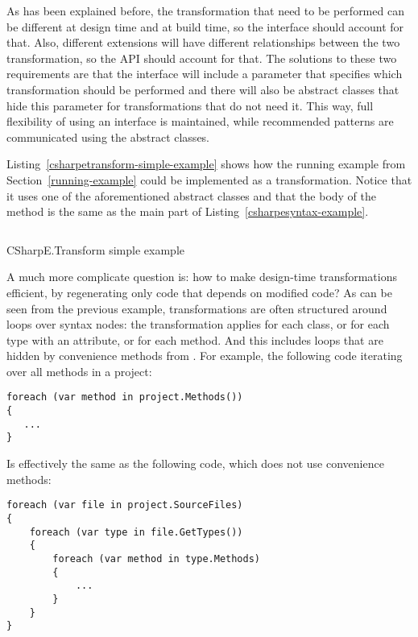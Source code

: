 As has been explained before, the transformation that need to be performed can be different at design time and at build time, so the interface should account for that. Also, different extensions will have different relationships between the two transformation, so the \ac{API} should account for that. The solutions to these two requirements are that the interface will include a parameter that specifies which transformation should be performed and there will also be abstract classes that hide this parameter for transformations that do not need it. This way, full flexibility of using an interface is maintained, while recommended patterns are communicated using the abstract classes.

Listing~\ref{csharpetransform-simple-example} shows how the running example from Section~\ref{running-example} could be implemented as a transformation. Notice that it uses one of the aforementioned abstract classes and that the body of the method is the same as the main part of Listing~\ref{csharpesyntax-example}.

\begin{listing}
\inputminted[firstline=9,lastline=27]{csharp}{samples/CSharpETransform.Simple/EntityTransformation.cs}
\caption{CSharpE.Transform simple example}
\label{csharpetransform-simple-example}
\end{listing}

\medskip

A much more complicate question is: how to make design-time transformations efficient, by regenerating only code that depends on modified code? As can be seen from the previous example, transformations are often structured around  loops over syntax nodes: the transformation applies for each class, or for each type with an attribute, or for each method. And this includes  loops that are hidden by convenience methods from . For example, the following code iterating over all methods in a project:

\begin{verbatim}
foreach (var method in project.Methods())
{
   ...
}
\end{verbatim}

Is effectively the same as the following code, which does not use convenience methods:

\begin{verbatim}
foreach (var file in project.SourceFiles)
{
    foreach (var type in file.GetTypes())
    {
        foreach (var method in type.Methods)
        {
            ...
        }
    }
}
\end{verbatim}

